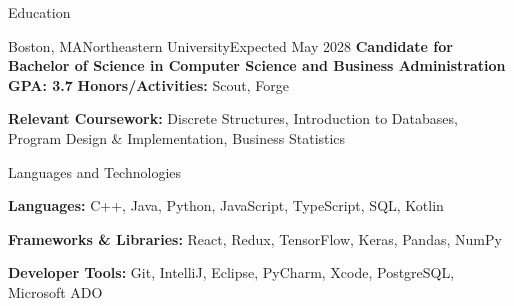 \documentclass[]{mcdowellcv}
\begin{document}
	\makeheader
	\begin{cvsection}{Education}
		\begin{cvsubsection}{Boston, MA}{Northeastern University}{Expected May 2028}
			\textbf{Candidate for Bachelor of Science in Computer Science and Business Administration \hfill{GPA: 3.7}}
			\textbf{Honors/Activities:} Scout, Forge
			\vspace{-2mm}
			
			\textbf{Relevant Coursework:} Discrete Structures, Introduction to Databases, Program Design \& Implementation, Business Statistics
		\end{cvsubsection}
	\end{cvsection}
		\begin{cvsection}{Languages and Technologies}
		\begin{cvsubsection}{}{}{}	

\textbf{Languages:} C++, Java, Python, JavaScript, TypeScript, SQL, Kotlin
\vspace{-2mm}

\textbf{Frameworks \& Libraries:} React, Redux, TensorFlow, Keras, Pandas, NumPy
\vspace{-2mm}

\textbf{Developer Tools:} Git, IntelliJ, Eclipse, PyCharm, Xcode, PostgreSQL, Microsoft ADO
		\end{cvsubsection}
	\end{cvsection}
\end{document}

